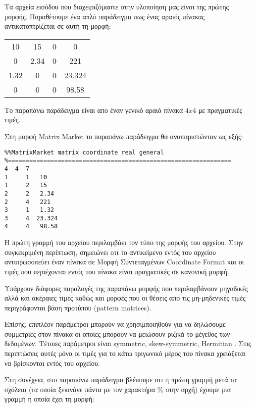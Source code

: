 Τα αρχεία εισόδου που διαχειριζόμαστε στην υλοποίηση μας είναι της πρώτης μορφής. Παραθέτουμε ένα απλό παράδειγμα πως ένας αραιός πίνακας αντικατοπτρίζεται σε αυτή τη μορφή:

\begin{center}
\begin{tabular}{ c c c c}
 10 & 15 & 0 & 0 \\ 
 0 & 2.34 & 0 & 221 \\  
 1.32 & 0 & 0 & 23.324 \\
 0 & 0 & 0 & 98.58
\end{tabular}
\end{center}

Το παραπάνω παράδειγμα είναι απο έναν γενικό αραιό πίνακα $4x4$ με πραγματικές τιμές.

Στη μορφή Matrix Market το παραπάνω παράδειγμα θα αναπαριστώνταν ως εξής:
\begin{verbatim}
%%MatrixMarket matrix coordinate real general
%===============================================================
4  4  7
1     1   10
1     2   15
2     2   2.34
2     4   221
3     1   1.32
3     4  23.324
4     4   98.58
\end{verbatim}
Η πρώτη γραμμή του αρχείου περιλαμβάει τον τύπο της μορφής του αρχείου. Στην συγκεκριμένη περίπτωση, σημειώνει οτι το αντικείμενο εντός του αρχείου αντιπρωσοπεύει έναν πίνακα σε Μορφή Συντεταγμένων  Coordinate Format  και οι τιμές που περιέχονται εντός του πίνακα είναι πραγματικές σε κανονική μορφή.

Υπάρχουν διάφορες παραλαγές της παραπάνω μορφής που περιλαμβάνουν μηγαδικές αλλά και ακέραιες τιμές καθώς και μορφές που οι θέσεις απο τις μη-μηδενικές τιμές περιγράφονται βάση προτύπου (pattern matrices).

Επίσης, επιπλέον παράμετροι μπορούν να χρησιμποιηθούν για να δηλώσουμε συμμετρίες στον πίνακα οι οποίες μπορούν να μειώσουν ριζικά το μέγεθος των δεδομένων. Τέτοιες παράμετροι είναι  symmetric, skew-symmetric, Hermitian . Στις περιπτώσεις αυτές μόνο οι τιμές για το κάτω τριγωνικό μέρος του πίνακα χρειάζεται να βρίσκονται εντός του αρχείου.

Στη συνέχεια, στο παραπάνω παράδειγμα βλέπουμε οτι η πρώτη γραμμή μετά τα σχόλεια (τα οποία ξεκινάνε πάντα με τον χαρακτήρα \% στην αρχή) έχουμε μια γραμμή η οποία έχει τη μορφή:\\

